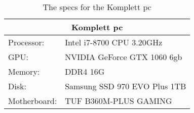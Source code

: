 \begin{table}[ht]
    \begin{tabular}{ll}
    \hline
    \multicolumn{2}{|c|}{Komplett pc}           \\ \hline
    Processor:   & Intel i7-8700 CPU 3.20GHz    \\
    GPU:         & NVIDIA GeForce GTX 1060 6gb  \\
    Memory:      & DDR4 16G                     \\
    Disk:        & Samsung SSD 970 EVO Plus 1TB \\
    Motherboard: & TUF B360M-PLUS GAMING       
    \end{tabular}
    \caption{The specs for the Komplett pc}
    \label{tab:komplett}
\end{table}